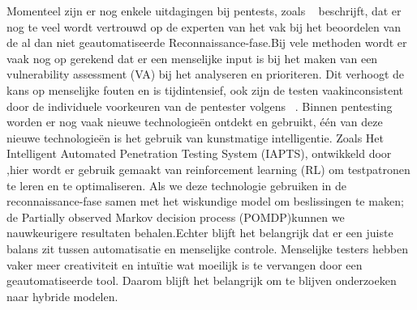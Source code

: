 Momenteel zijn er nog enkele uitdagingen bij pentests, zoals ~\textcite{Fugkeaw} beschrijft, dat er nog te veel wordt vertrouwd op de experten van het vak bij het beoordelen van de al dan niet geautomatiseerde Reconnaissance-fase.Bij vele methoden wordt er vaak nog op gerekend dat er een menselijke input is bij het maken van een vulnerability assessment (VA) bij het analyseren en prioriteren. Dit verhoogt de kans op menselijke fouten en is tijdintensief, ook zijn de testen vaakinconsistent door de individuele voorkeuren van de pentester volgens ~\textcite{Ghanem}.
Binnen pentesting worden er nog vaak nieuwe technologieën ontdekt en gebruikt, één van deze nieuwe technologieën is het gebruik van kunstmatige intelligentie. Zoals Het Intelligent Automated Penetration Testing System (IAPTS), ontwikkeld door \textcite{Ghanem},hier wordt er gebruik gemaakt van reinforcement learning (RL) om testpatronen te leren en te optimaliseren. Als we deze technologie gebruiken in de reconnaissance-fase samen met het wiskundige model om beslissingen te maken; de Partially observed Markov decision process (POMDP)kunnen we nauwkeurigere resultaten behalen.Echter blijft het belangrijk dat er een juiste balans zit tussen automatisatie en menselijke controle. Menselijke testers hebben vaker meer creativiteit en intuïtie wat moeilijk is te vervangen door een geautomatiseerde tool. Daarom blijft het belangrijk om te blijven onderzoeken naar hybride modelen.








